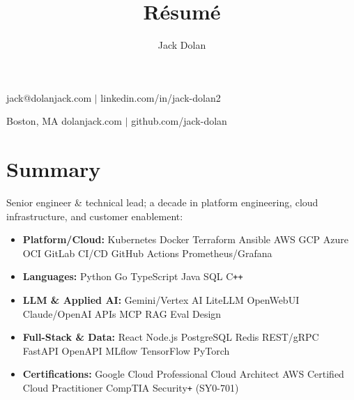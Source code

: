 \documentclass[10pt]{extarticle}
\makeatletter
\renewcommand{\maketitle}{
{\huge\bfseries\theauthor}\hfill jack@dolanjack.com $|$ linkedin.com/in/jack-dolan2

\vspace{0.2em}

Boston, MA \hfill dolanjack.com $|$ github.com/jack-dolan
}
\makeatother
\begin{document}
\title{R\'esum\'e}
\author{Jack Dolan}
\maketitle
{}


\section{Summary}
\hspace*{-0.4cm}Senior engineer \& technical lead; a decade in platform engineering, cloud infrastructure, and customer enablement:
    \begin{itemize}
    \itemsep0em
    \item \textbf{Platform/Cloud:} Kubernetes \text{\textbar} Docker \text{\textbar} Terraform \text{\textbar} Ansible \text{\textbar} AWS \text{\textbar} GCP \text{\textbar} Azure \text{\textbar} OCI \text{\textbar} GitLab CI/CD \text{\textbar} GitHub Actions \text{\textbar} Prometheus/Grafana
    \item \textbf{Languages:} Python \text{\textbar} Go \text{\textbar} TypeScript \text{\textbar} Java \text{\textbar} SQL \text{\textbar} C\verb!++!
    \item \textbf{LLM \& Applied AI:} Gemini/Vertex AI \text{\textbar} LiteLLM \text{\textbar} OpenWebUI \text{\textbar} Claude/OpenAI APIs \text{\textbar} MCP \text{\textbar} RAG \text{\textbar} Eval Design
    \item \textbf{Full-Stack \& Data:} React \text{\textbar} Node.js \text{\textbar} PostgreSQL \text{\textbar} Redis \text{\textbar} REST/gRPC \text{\textbar} FastAPI \text{\textbar} OpenAPI \text{\textbar} MLflow \text{\textbar} TensorFlow \text{\textbar} PyTorch
    \item \textbf{Certifications:} Google Cloud Professional Cloud Architect \text{\textbar} AWS Certified Cloud Practitioner \text{\textbar} CompTIA Security\verb!+! (SY0-701) \end{itemize}
\end{document}
